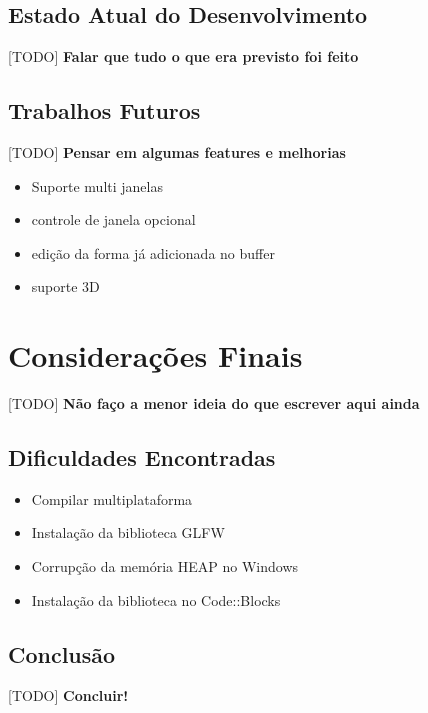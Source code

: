\documentclass[12pt, %
openright,
oneside, %
a4paper,    %
brazil]{facom-ufu-abntex2}
\begin{document}
\section{Estado Atual do Desenvolvimento}
[TODO] \textbf{Falar que tudo o que era previsto foi feito}

\section{Trabalhos Futuros}
[TODO] \textbf{Pensar em algumas features e melhorias}

\begin{itemize}
    \item Suporte multi janelas
    \item controle de janela opcional
    \item edição da forma já adicionada no buffer
    \item suporte 3D
\end{itemize}

\chapter{Considerações Finais}
[TODO] \textbf{Não faço a menor ideia do que escrever aqui ainda}

\section{Dificuldades Encontradas}

\begin{itemize}
  
  \item Compilar multiplataforma
  \item Instalação da biblioteca GLFW
  \item Corrupção da memória HEAP no Windows
  \item Instalação da biblioteca no Code::Blocks
  
\end{itemize}

\section{Conclusão}
[TODO] \textbf{Concluir!}

\end{document}
